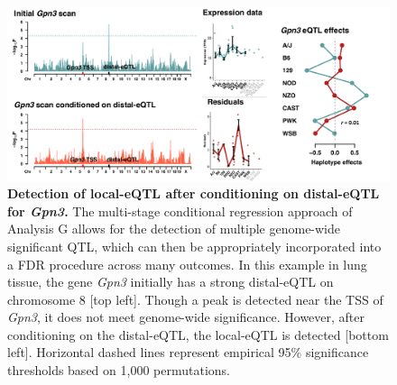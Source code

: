 \documentclass[10pt,letterpaper,twoside]{article}
\begin{document}
\begin{figure}[hp]
\renewcommand{\familydefault}{\sfdefault}\normalfont
\centering
\includegraphics[width=\textwidth, trim={0in 0in 0in 0in}, clip]{figs/gpn3_conditional_scan.pdf}
\caption{\textbf{Detection of local-eQTL after conditioning on distal-eQTL for \textit{Gpn3}.} 
The multi-stage conditional regression approach of Analysis G allows for the detection of multiple genome-wide significant QTL, which can then be appropriately incorporated into a FDR procedure across many outcomes. In this example in lung tissue, the gene \textit{Gpn3} initially has a strong distal-eQTL on chromosome 8 [top left]. Though a peak is detected near the TSS of \textit{Gpn3}, it does not meet genome-wide significance. However, after conditioning on the distal-eQTL, the local-eQTL is detected [bottom left]. Horizontal dashed lines represent empirical 95\% significance thresholds based on 1,000 permutations.
\label{fig:conditional_scans}}
\end{figure}
\end{document}
